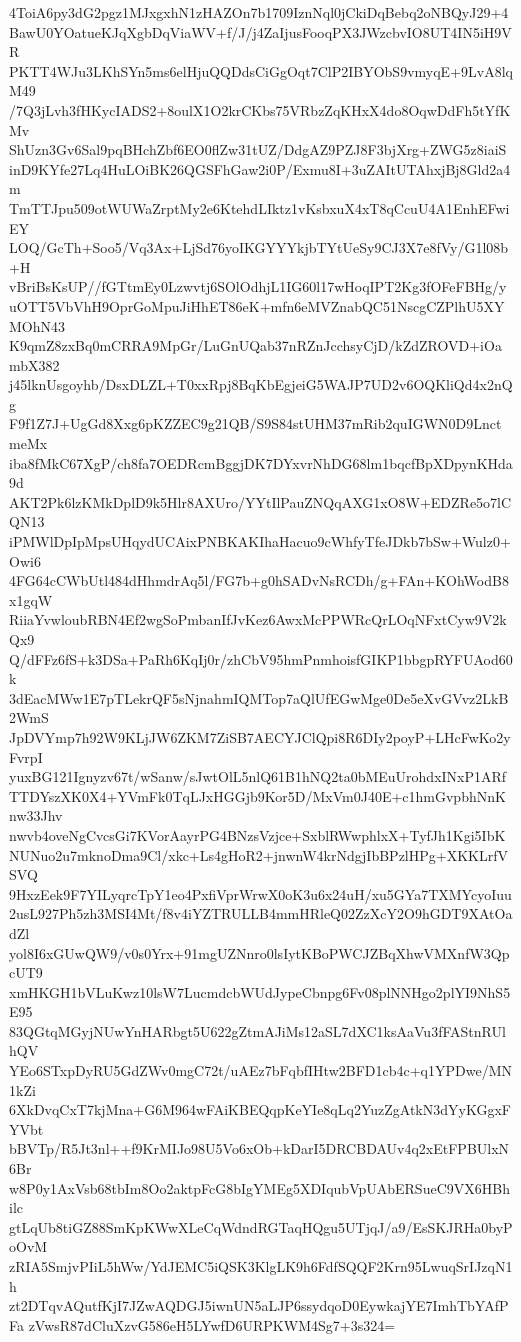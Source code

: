 4ToiA6py3dG2pgz1MJxgxhN1zHAZOn7b1709IznNql0jCkiDqBebq2oNBQyJ29+4
BawU0YOatueKJqXgbDqViaWV+f/J/j4ZaIjusFooqPX3JWzcbvIO8UT4IN5iH9VR
PKTT4WJu3LKhSYn5ms6elHjuQQDdsCiGgOqt7ClP2IBYObS9vmyqE+9LvA8lqM49
/7Q3jLvh3fHKycIADS2+8oulX1O2krCKbs75VRbzZqKHxX4do8OqwDdFh5tYfKMv
ShUzn3Gv6Sal9pqBHchZbf6EO0flZw31tUZ/DdgAZ9PZJ8F3bjXrg+ZWG5z8iaiS
inD9KYfe27Lq4HuLOiBK26QGSFhGaw2i0P/Exmu8I+3uZAItUTAhxjBj8Gld2a4m
TmTTJpu509otWUWaZrptMy2e6KtehdLIktz1vKsbxuX4xT8qCcuU4A1EnhEFwiEY
LOQ/GcTh+Soo5/Vq3Ax+LjSd76yoIKGYYYkjbTYtUeSy9CJ3X7e8fVy/G1l08b+H
vBriBsKsUP//fGTtmEy0Lzwvtj6SOlOdhjL1IG60l17wHoqIPT2Kg3fOFeFBHg/y
uOTT5VbVhH9OprGoMpuJiHhET86eK+mfn6eMVZnabQC51NscgCZPlhU5XYMOhN43
K9qmZ8zxBq0mCRRA9MpGr/LuGnUQab37nRZnJcchsyCjD/kZdZROVD+iOambX382
j45lknUsgoyhb/DsxDLZL+T0xxRpj8BqKbEgjeiG5WAJP7UD2v6OQKliQd4x2nQg
F9f1Z7J+UgGd8Xxg6pKZZEC9g21QB/S9S84stUHM37mRib2quIGWN0D9LnctmeMx
iba8fMkC67XgP/ch8fa7OEDRcmBggjDK7DYxvrNhDG68lm1bqcfBpXDpynKHda9d
AKT2Pk6lzKMkDplD9k5Hlr8AXUro/YYtIlPauZNQqAXG1xO8W+EDZRe5o7lCQN13
iPMWlDpIpMpsUHqydUCAixPNBKAKIhaHacuo9cWhfyTfeJDkb7bSw+Wulz0+Owi6
4FG64cCWbUtl484dHhmdrAq5l/FG7b+g0hSADvNsRCDh/g+FAn+KOhWodB8x1gqW
RiiaYvwloubRBN4Ef2wgSoPmbanIfJvKez6AwxMcPPWRcQrLOqNFxtCyw9V2kQx9
Q/dFFz6fS+k3DSa+PaRh6KqIj0r/zhCbV95hmPnmhoisfGIKP1bbgpRYFUAod60k
3dEacMWw1E7pTLekrQF5sNjnahmIQMTop7aQlUfEGwMge0De5eXvGVvz2LkB2WmS
JpDVYmp7h92W9KLjJW6ZKM7ZiSB7AECYJClQpi8R6DIy2poyP+LHcFwKo2yFvrpI
yuxBG121Ignyzv67t/wSanw/sJwtOlL5nlQ61B1hNQ2ta0bMEuUrohdxINxP1ARf
TTDYszXK0X4+YVmFk0TqLJxHGGjb9Kor5D/MxVm0J40E+c1hmGvpbhNnKnw33Jhv
nwvb4oveNgCvcsGi7KVorAayrPG4BNzsVzjce+SxblRWwphlxX+TyfJh1Kgi5IbK
NUNuo2u7mknoDma9Cl/xkc+Ls4gHoR2+jnwnW4krNdgjIbBPzlHPg+XKKLrfVSVQ
9HxzEek9F7YILyqrcTpY1eo4PxfiVprWrwX0oK3u6x24uH/xu5GYa7TXMYcyoIuu
2usL927Ph5zh3MSI4Mt/f8v4iYZTRULLB4mmHRleQ02ZzXcY2O9hGDT9XAtOadZl
yol8I6xGUwQW9/v0s0Yrx+91mgUZNnro0lsIytKBoPWCJZBqXhwVMXnfW3QpcUT9
xmHKGH1bVLuKwz10lsW7LucmdcbWUdJypeCbnpg6Fv08plNNHgo2plYI9NhS5E95
83QGtqMGyjNUwYnHARbgt5U622gZtmAJiMs12aSL7dXC1ksAaVu3fFAStnRUlhQV
YEo6STxpDyRU5GdZWv0mgC72t/uAEz7bFqbfIHtw2BFD1cb4c+q1YPDwe/MN1kZi
6XkDvqCxT7kjMna+G6M964wFAiKBEQqpKeYIe8qLq2YuzZgAtkN3dYyKGgxFYVbt
bBVTp/R5Jt3nl++f9KrMIJo98U5Vo6xOb+kDarI5DRCBDAUv4q2xEtFPBUlxN6Br
w8P0y1AxVsb68tbIm8Oo2aktpFcG8bIgYMEg5XDIqubVpUAbERSueC9VX6HBhilc
gtLqUb8tiGZ88SmKpKWwXLeCqWdndRGTaqHQgu5UTjqJ/a9/EsSKJRHa0byPoOvM
zRIA5SmjvPIiL5hWw/YdJEMC5iQSK3KlgLK9h6FdfSQQF2Krn95LwuqSrIJzqN1h
zt2DTqvAQutfKjI7JZwAQDGJ5iwnUN5aLJP6ssydqoD0EywkajYE7ImhTbYAfPFa
zVwsR87dCluXzvG586eH5LYwfD6URPKWM4Sg7+3s324=
